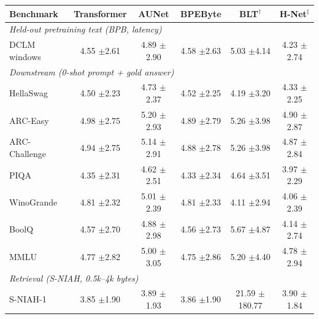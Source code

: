 \begin{table}[t]
\centering
\small
\setlength{\tabcolsep}{5pt}
\begin{tabular}{lccccc}
\toprule
\textbf{Benchmark} & \textbf{Transformer} & \textbf{AUNet} & \textbf{BPEByte} & \textbf{BLT$^{\dagger}$} & \textbf{H-Net$^{\ddagger}$} \\
\midrule
\multicolumn{6}{l}{\emph{Held-out pretraining text (BPB, latency)}} \\
\quad DCLM windows & 4.55 {\scriptsize$\pm$2.61} & 4.89 {\scriptsize$\pm$2.90} & 4.58 {\scriptsize$\pm$2.63} & 5.03 {\scriptsize$\pm$4.14} & 4.23 {\scriptsize$\pm$2.74} \\
\midrule
\multicolumn{6}{l}{\emph{Downstream (0-shot prompt + gold answer)}} \\
\quad HellaSwag & 4.50 {\scriptsize$\pm$2.23} & 4.73 {\scriptsize$\pm$2.37} & 4.52 {\scriptsize$\pm$2.25} & 4.19 {\scriptsize$\pm$3.20} & 4.33 {\scriptsize$\pm$2.25} \\
\quad ARC-Easy & 4.98 {\scriptsize$\pm$2.75} & 5.20 {\scriptsize$\pm$2.93} & 4.89 {\scriptsize$\pm$2.79} & 5.26 {\scriptsize$\pm$3.98} & 4.90 {\scriptsize$\pm$2.87} \\
\quad ARC-Challenge & 4.94 {\scriptsize$\pm$2.75} & 5.14 {\scriptsize$\pm$2.91} & 4.88 {\scriptsize$\pm$2.78} & 5.26 {\scriptsize$\pm$3.98} & 4.87 {\scriptsize$\pm$2.84} \\
\quad PIQA & 4.35 {\scriptsize$\pm$2.31} & 4.62 {\scriptsize$\pm$2.51} & 4.33 {\scriptsize$\pm$2.34} & 4.64 {\scriptsize$\pm$3.51} & 3.97 {\scriptsize$\pm$2.29} \\
\quad WinoGrande & 4.81 {\scriptsize$\pm$2.32} & 5.01 {\scriptsize$\pm$2.39} & 4.81 {\scriptsize$\pm$2.33} & 4.11 {\scriptsize$\pm$2.94} & 4.06 {\scriptsize$\pm$2.39} \\
\quad BoolQ & 4.57 {\scriptsize$\pm$2.70} & 4.88 {\scriptsize$\pm$2.98} & 4.56 {\scriptsize$\pm$2.73} & 5.67 {\scriptsize$\pm$4.87} & 4.14 {\scriptsize$\pm$2.74} \\
\quad MMLU & 4.77 {\scriptsize$\pm$2.82} & 5.00 {\scriptsize$\pm$3.05} & 4.75 {\scriptsize$\pm$2.86} & 5.20 {\scriptsize$\pm$4.40} & 4.78 {\scriptsize$\pm$2.94} \\
\midrule
\multicolumn{6}{l}{\emph{Retrieval (S-NIAH, 0.5k--4k bytes)}} \\
\quad S-NIAH-1 & 3.85 {\scriptsize$\pm$1.90} & 3.89 {\scriptsize$\pm$1.93} & 3.86 {\scriptsize$\pm$1.90} & 21.59 {\scriptsize$\pm$180.77} & 3.90 {\scriptsize$\pm$1.84} \\

\end{tabular}
\end{table}

